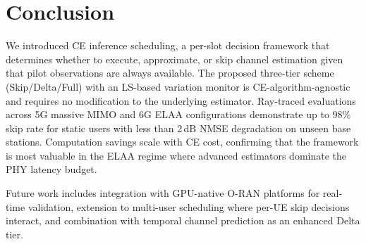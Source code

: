 
\section{Conclusion}\label{Conclusion}

We introduced CE inference scheduling, a per-slot decision framework that determines whether to execute, approximate, or skip channel estimation given that pilot observations are always available.
The proposed three-tier scheme (Skip/Delta/Full) with an LS-based variation monitor is CE-algorithm-agnostic and requires no modification to the underlying estimator.
Ray-traced evaluations across 5G massive MIMO and 6G ELAA configurations demonstrate up to 98\% skip rate for static users with less than 2\,dB NMSE degradation on unseen base stations.
Computation savings scale with CE cost, confirming that the framework is most valuable in the ELAA regime where advanced estimators dominate the PHY latency budget.

Future work includes integration with GPU-native O-RAN platforms for real-time validation, extension to multi-user scheduling where per-UE skip decisions interact, and combination with temporal channel prediction as an enhanced Delta tier.
